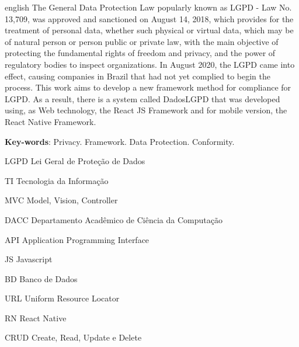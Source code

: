 \documentclass[
	12pt,				%
	openright,			%
	oneside,			%
	a4paper,			%
	english,			%
	french,				%
	spanish,			%
	brazil,				%
	]{abntex2}
\begin{document}
\begin{resumo}[Abstract]
 \begin{otherlanguage*}{english}
   \vspace{\onelineskip}
    \noindent 
The General Data Protection Law popularly known as LGPD - Law No. 13,709, was approved and sanctioned on August 14, 2018, which provides for the treatment of personal data, whether such physical or virtual data, which may be of natural person or person public or private law, with the main objective of protecting the fundamental rights of freedom and privacy, and the power of regulatory bodies to inspect organizations. In August 2020, the LGPD came into effect, causing companies in Brazil that had not yet complied to begin the process. This work aims to develop a new framework method for compliance for LGPD. As a result, there is a system called DadosLGPD that was developed using, as Web technology, the React JS Framework and for mobile version, the React Native Framework.
   
   \vspace{\onelineskip}
   
   \noindent  \textbf{Key-words}:  Privacy. Framework. Data Protection. Conformity.
 \end{otherlanguage*}
\end{resumo}

\listoffigures*
\cleardoublepage

\listoftables*
\cleardoublepage

\begin{siglas}
    \item[LGPD] Lei Geral de Proteção de Dados
    \item[TI] Tecnologia da Informação
    \item[MVC] Model, Vision, Controller
    \item[DACC] Departamento Acadêmico de Ciência da Computação
    \item[API] Application Programming Interface
    \item[JS] Javascript
    \item[BD] Banco de Dados
    \item[URL] Uniform Resource Locator
    \item[RN] React Native
    \item[CRUD] Create, Read, Update e Delete
    
\end{siglas}
\end{document}
